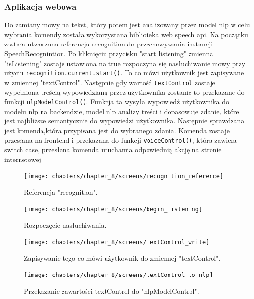 \subsubsection{Aplikacja webowa}
Do zamiany mowy na tekst, który potem jest analizowany przez model nlp w celu wybrania komendy została wykorzystana biblioteka web speech api. Na początku została utworzona referencja recognition do przechowywania instancji SpeechRecognintion. Po kliknięciu przycisku "start listening" zmienna "isListening" zostaje ustawiona na true rozpoczyna się nasłuchiwanie mowy przy użyciu \texttt{recognition.current.start()}. To co mówi użytkownik jest zapisywane w zmiennej "textControl". Następnie gdy wartość \texttt{textControl} zostaje wypełniona treścią wypowiedzianą przez użytkownika zostanie to przekazane do funkcji \texttt{nlpModelControl()}. Funkcja ta wysyła wypowiedź użytkownika do modelu nlp na backendzie, model nlp analizy treści i dopasowuje  zdanie, które jest najbliższe semantycznie do wypowiedzi użytkownika. Następnie sprawdzana jest komenda,która przypisana jest do wybranego zdania. Komenda zostaje przesłana na frontend i przekazana do funkcji \texttt{voiceControl()}, która zawiera switch case, przesłana komenda uruchamia odpowiednią akcję na stronie internetowej.


\begin{figure}[H]
    \centering
    \texttt{[image: chapters/chapter\_8/screens/recognition\_reference]}
    \caption{Referencja "recognition".}
    \label{img:recognition_reference}
\end{figure}


\begin{figure}[H]
    \centering
    \texttt{[image: chapters/chapter\_8/screens/begin\_listening]}
    \caption{Rozpoczęcie nasłuchiwania.}
    \label{img:begin_listening}
\end{figure}

\begin{figure}[H]
    \centering
    \texttt{[image: chapters/chapter\_8/screens/textControl\_write]}
    \caption{Zapisywanie tego co mówi użytkownik do zmiennej "textControl".}
    \label{img:textControl_write}
\end{figure}



\begin{figure}[H]
    \centering
    \texttt{[image: chapters/chapter\_8/screens/textControl\_to\_nlp]}
    \caption{Przekazanie zawartości textControl do "nlpModelControl".}
    \label{img:textControl_to_nlp}
\end{figure}

